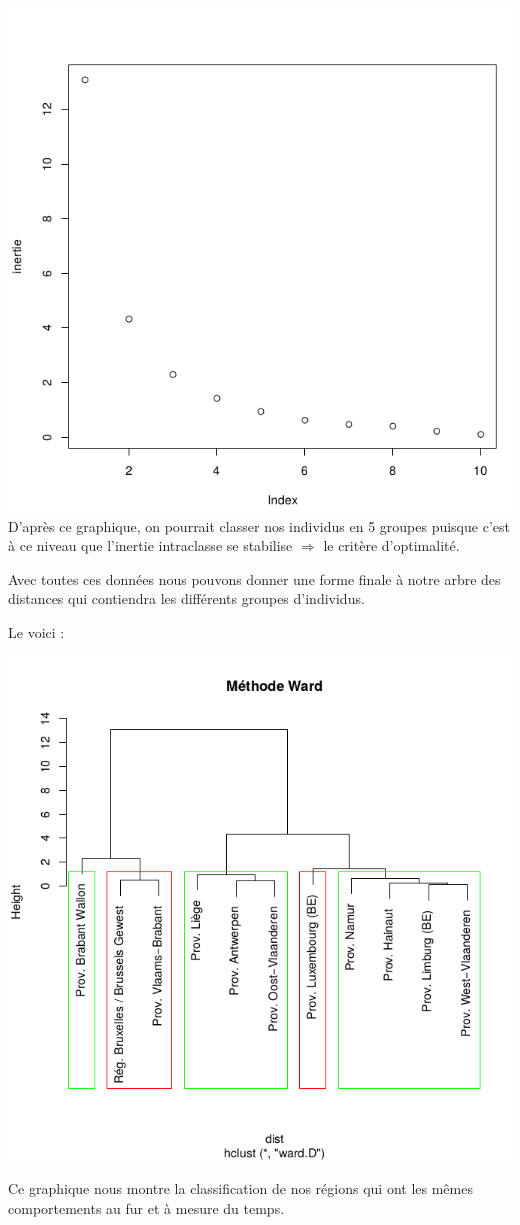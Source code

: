 \documentclass{article}
\begin{document}
\includegraphics[width=\textwidth]{Inertie}
\newpage
D'après ce graphique, on pourrait classer nos individus en 5 groupes puisque c'est à ce niveau que l'inertie intraclasse se stabilise $\Rightarrow$ le critère d'optimalité.

Avec toutes ces données nous pouvons donner une forme finale à notre arbre des distances qui contiendra les différents groupes d'individus.

Le voici : 

\includegraphics[width=\textwidth]{Ward}

Ce graphique nous montre la classification de nos régions qui ont les mêmes comportements au fur et à mesure du temps.


\end{document}
